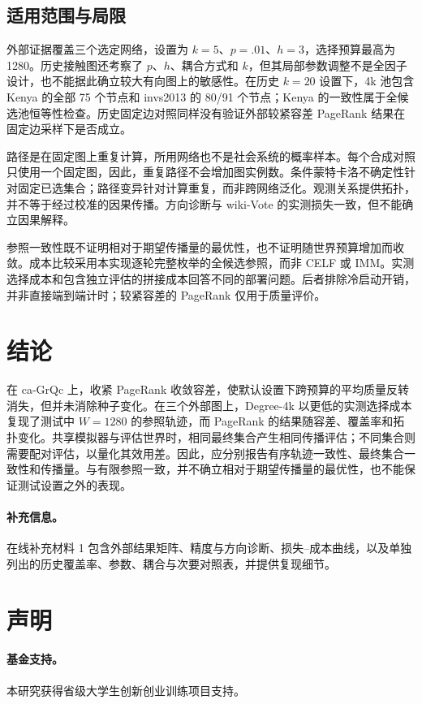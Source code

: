 \documentclass[smallextended]{svjour3}
\begin{document}
\subsection{适用范围与局限}
外部证据覆盖三个选定网络，设置为 $k=5$、$p=.01$、$h=3$，选择预算最高为 1280。历史接触图还考察了 $p$、$h$、耦合方式和 $k$，但其局部参数调整不是全因子设计，也不能据此确立较大有向图上的敏感性。在历史 $k=20$ 设置下，4k 池包含 Kenya 的全部 75 个节点和 invs2013 的 80/91 个节点；Kenya 的一致性属于全候选池恒等性检查。历史固定边对照同样没有验证外部较紧容差 PageRank 结果在固定边采样下是否成立。

路径是在固定图上重复计算，所用网络也不是社会系统的概率样本。每个合成对照只使用一个固定图，因此，重复路径不会增加图实例数。条件蒙特卡洛不确定性针对固定已选集合；路径变异针对计算重复，而非跨网络泛化。观测关系提供拓扑，并不等于经过校准的因果传播。方向诊断与 wiki-Vote 的实测损失一致，但不能确立因果解释。

参照一致性既不证明相对于期望传播量的最优性，也不证明随世界预算增加而收敛。成本比较采用本实现逐轮完整枚举的全候选参照，而非 CELF 或 IMM。实测选择成本和包含独立评估的拼接成本回答不同的部署问题。后者排除冷启动开销，并非直接端到端计时；较紧容差的 PageRank 仅用于质量评价。

\section{结论}
在 ca-GrQc 上，收紧 PageRank 收敛容差，使默认设置下跨预算的平均质量反转消失，但并未消除种子变化。在三个外部图上，Degree-4k 以更低的实测选择成本复现了测试中 $W=1280$ 的参照轨迹，而 PageRank 的结果随容差、覆盖率和拓扑变化。共享模拟器与评估世界时，相同最终集合产生相同传播评估；不同集合则需要配对评估，以量化其效用差。因此，应分别报告有序轨迹一致性、最终集合一致性和传播量。与有限参照一致，并不确立相对于期望传播量的最优性，也不能保证测试设置之外的表现。

\paragraph{补充信息。}在线补充材料 1 包含外部结果矩阵、精度与方向诊断、损失--成本曲线，以及单独列出的历史覆盖率、参数、耦合与次要对照表，并提供复现细节。
\section*{声明}
\paragraph{基金支持。}本研究获得省级大学生创新创业训练项目支持。
\end{document}
